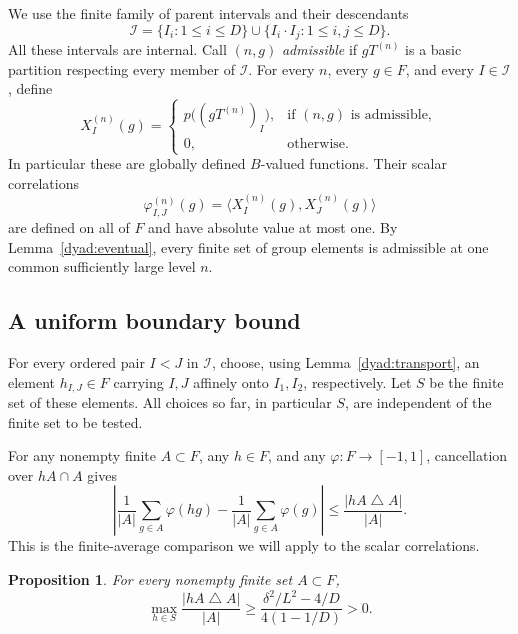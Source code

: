 \documentclass[11pt]{article}
\newcommand{\ip}[2]{\langle #1,#2\rangle}
\newtheorem{proposition}[theorem]{Proposition}
\theoremstyle{definition}
\numberwithin{equation}{section}
\begin{document}
We use the finite family of parent intervals and their descendants
\[
  \mathcal I=\{I_i:1\leq i\leq D\}
       \cup\{I_i\cdot I_j:1\leq i,j\leq D\}.
\]
All these intervals are internal.  Call $(n,g)$ \emph{admissible}
if $gT^{(n)}$ is a basic partition respecting every member of
$\mathcal I$.  For every $n$, every $g\in F$, and every
$I\in\mathcal I$, define
\begin{equation}\label{color:global}
  X_I^{(n)}(g)=
  \begin{cases}
    p\bigl((gT^{(n)})_I\bigr),&\text{if $(n,g)$ is admissible},\\
    0,&\text{otherwise}.
  \end{cases}
\end{equation}
In particular these are globally defined $B$-valued functions.
Their scalar correlations
\[
  \varphi_{I,J}^{(n)}(g)
     =\ip{X_I^{(n)}(g)}{X_J^{(n)}(g)}
\]
are defined on all of $F$ and have absolute value at most one.
By Lemma~\ref{dyad:eventual}, every finite set of group elements is
admissible at one common sufficiently large level $n$.

\subsection{A uniform boundary bound}\label{sec:boundary}

For every
ordered pair $I<J$ in $\mathcal I$, choose, using
Lemma~\ref{dyad:transport}, an element $h_{I,J}\in F$ carrying
$I,J$ affinely onto $I_1,I_2$, respectively.  Let $S$ be the finite
set of these elements.  All choices so far, in particular $S$, are
independent of the finite set to be tested.

For any nonempty finite \(A\subset F\), any \(h\in F\), and any
\(\varphi:F\to[-1,1]\), cancellation over \(hA\cap A\) gives
\begin{equation}\label{eq:finite-translation}
 \left|\frac1{|A|}\sum_{g\in A}\varphi(hg)
       -\frac1{|A|}\sum_{g\in A}\varphi(g)\right|
 \le\frac{|hA\mathbin{\triangle}A|}{|A|}.
\end{equation}
This is the finite-average comparison we will apply to the scalar
correlations.

\begin{proposition}\label{avg:boundary}
For every nonempty finite set $A\subset F$,
\begin{equation}\label{avg:boundary-bound}
  \max_{h\in S}\frac{|hA\mathbin{\triangle}A|}{|A|}
  \geq \frac{\delta^2/L^2-4/D}{4(1-1/D)}>0.
\end{equation}
\end{proposition}
\end{document}
